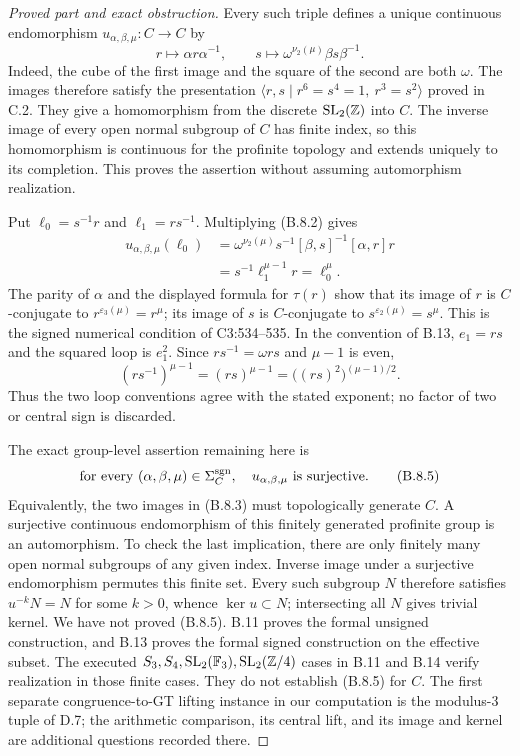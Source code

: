 \begin{proof}[Proved part and exact obstruction]
Every such triple defines a unique continuous endomorphism
$u_{\alpha,\beta,\mu}:C\to C$ by
\[
 r\longmapsto \alpha r\alpha^{-1},\qquad
 s\longmapsto \omega^{\nu_2(\mu)}\beta s\beta^{-1}.
 \tag{B.8.3}
\]
Indeed, the cube of the first image and the square of the second
are both $\omega$. The images therefore satisfy the presentation
$\langle r,s\mid r^6=s^4=1,\ r^3=s^2\rangle$ proved in C.2.
They give a homomorphism from the discrete $\operatorname{SL}_2(\mathbb Z)$ into $C$.
The inverse image of every open normal subgroup of $C$ has finite
index, so this homomorphism is continuous for the profinite topology
and extends uniquely to its completion. This proves the assertion
without assuming automorphism realization.

Put $\ell_0=s^{-1}r$ and $\ell_1=rs^{-1}$.
Multiplying (B.8.2) gives
\[
 \begin{split}
 u_{\alpha,\beta,\mu}(\ell_0)
 &=\omega^{\nu_2(\mu)}s^{-1}
       [\beta,s]^{-1}[\alpha,r]r\\
 &=s^{-1}\ell_1^{\mu-1}r
   =\ell_0^\mu.
 \end{split}
 \tag{B.8.4}
\]
The parity of $\alpha$ and the displayed formula for $\tau(r)$
show that its image of $r$ is $C$-conjugate to
$r^{\varepsilon_3(\mu)}=r^\mu$; its image of $s$ is
$C$-conjugate to $s^{\varepsilon_2(\mu)}=s^\mu$.
This is the signed numerical condition of C3:534--535.
In the convention of B.13, $e_1=rs$ and the squared loop is
$e_1^2$. Since $rs^{-1}=\omega rs$ and $\mu-1$ is even,
\[
 (rs^{-1})^{\mu-1}=(rs)^{\mu-1}
                  =\bigl((rs)^2\bigr)^{(\mu-1)/2}.
\]
Thus the two loop conventions agree with the stated exponent;
no factor of two or central sign is discarded.

The exact group-level assertion remaining here is
\[
 \text{for every }(\alpha,\beta,\mu)\in\Sigma_C^{\rm sgn},
 \quad u_{\alpha,\beta,\mu}\text{ is surjective}.
 \tag{B.8.5}
\]
Equivalently, the two images in (B.8.3) must topologically generate
$C$. A surjective continuous endomorphism of this finitely generated
profinite group is an automorphism. To check the last implication,
there are only finitely many open normal subgroups of any given
index. Inverse image under a surjective endomorphism permutes this
finite set. Every such subgroup $N$ therefore satisfies
$u^{-k}N=N$ for some $k>0$, whence $\ker u\subset N$; intersecting
all $N$ gives trivial kernel. We have not proved (B.8.5).
B.11 proves the formal unsigned construction, and B.13 proves the
formal signed construction on the effective subset. The executed
$S_3,S_4,\operatorname{SL}_2(\mathbb F_3),\operatorname{SL}_2(\mathbb Z/4)$ cases in B.11 and B.14
verify realization in those finite cases. They do not establish
(B.8.5) for $C$. The first separate congruence-to-GT lifting
instance in our computation is the modulus-$3$ tuple of D.7;
the arithmetic comparison, its central lift, and its image and
kernel are additional questions recorded there.


\end{proof}

